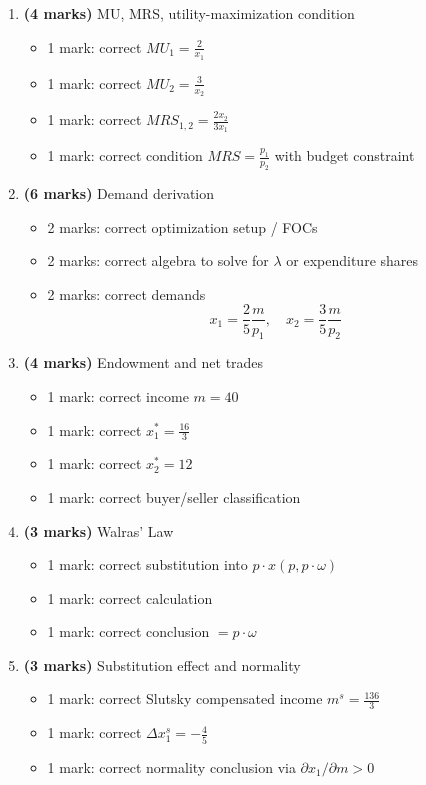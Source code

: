 \documentclass[12pt]{article}
\begin{document}
\begin{enumerate}[label=(\alph*)]
\item \textbf{(4 marks)} MU, MRS, utility-maximization condition
\begin{itemize}
\item 1 mark: correct \(MU_1=\frac{2}{x_1}\)
\item 1 mark: correct \(MU_2=\frac{3}{x_2}\)
\item 1 mark: correct \(MRS_{1,2}=\frac{2x_2}{3x_1}\)
\item 1 mark: correct condition \(MRS=\frac{p_1}{p_2}\) with budget constraint
\end{itemize}

\item \textbf{(6 marks)} Demand derivation
\begin{itemize}
\item 2 marks: correct optimization setup / FOCs
\item 2 marks: correct algebra to solve for \(\lambda\) or expenditure shares
\item 2 marks: correct demands
\[
\boxed{x_1=\frac{2}{5}\frac{m}{p_1},\quad x_2=\frac{3}{5}\frac{m}{p_2}}
\]
\end{itemize}

\item \textbf{(4 marks)} Endowment and net trades
\begin{itemize}
\item 1 mark: correct income \(m=40\)
\item 1 mark: correct \(x_1^*=\frac{16}{3}\)
\item 1 mark: correct \(x_2^*=12\)
\item 1 mark: correct buyer/seller classification
\end{itemize}

\item \textbf{(3 marks)} Walras' Law
\begin{itemize}
\item 1 mark: correct substitution into \(p\cdot x(p,p\cdot\omega)\)
\item 1 mark: correct calculation
\item 1 mark: correct conclusion \(=p\cdot\omega\)
\end{itemize}

\item \textbf{(3 marks)} Substitution effect and normality
\begin{itemize}
\item 1 mark: correct Slutsky compensated income \(m^s=\frac{136}{3}\)
\item 1 mark: correct \(\Delta x_1^s=\boxed{-\frac45}\)
\item 1 mark: correct normality conclusion via \(\partial x_1/\partial m>0\)
\end{itemize}
\end{enumerate}
\end{document}

